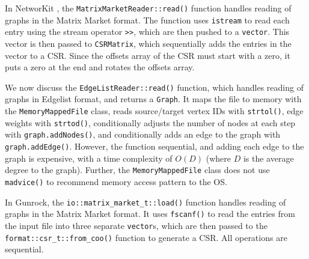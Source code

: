 




In NetworKit \cite{staudt2016networkit}, the \texttt{MatrixMarketReader::read()} function handles reading of graphs in the Matrix Market format. The function uses \texttt{istream} to read each entry using the stream operator \texttt{>>}, which are then pushed to a \texttt{vector}. This vector is then passed to \texttt{CSRMatrix}, which sequentially adds the entries in the vector to a CSR. Since the offsets array of the CSR must start with a zero, it puts a zero at the end and rotates the offsets array.

We now discuss the \texttt{EdgeListReader::read()} function, which handles reading of graphs in Edgelist format, and returns a \texttt{Graph}. It maps the file to memory with the \texttt{MemoryMappedFile} class, reads source/target vertex IDs with \texttt{strtol()}, edge weights with \texttt{strtod()}, conditionally adjusts the number of nodes at each step with \texttt{graph.addNodes()}, and conditionally adds an edge to the graph with \texttt{graph.addEdge()}. However, the function sequential, and adding each edge to the graph is expensive, with a time complexity of $O(D)$ (where $D$ is the average degree to the graph). Further, the \texttt{MemoryMappedFile} class does not use \texttt{madvice()} to recommend memory access pattern to the OS.

In Gunrock, the \texttt{io::matrix\_market\_t::load()} function handles reading of graphs in the Matrix Market format. It uses \texttt{fscanf()} to read the entries from the input file into three separate \texttt{vector}s, which are then passed to the \texttt{format::csr\_t::from\_coo()} function to generate a CSR. All operations are sequential.

